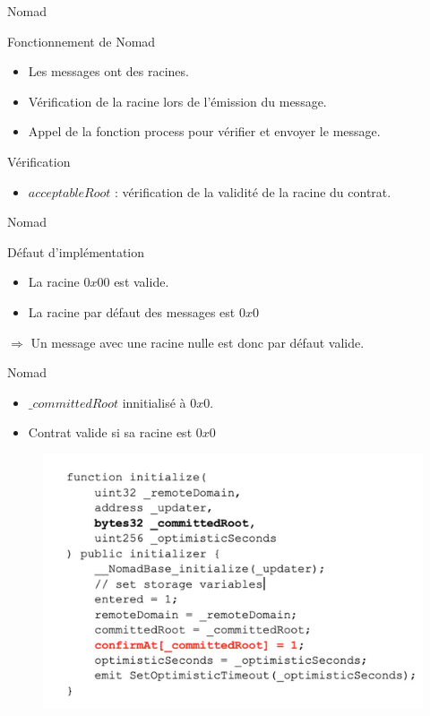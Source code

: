 \begin{frame}{Nomad}
    \begin{block}{Fonctionnement de Nomad}
        \begin{itemize}
            \item Les messages ont des racines.
            \item Vérification de la racine lors de l'émission du message.
            \item Appel de la fonction process pour vérifier et envoyer le message.
        \end{itemize}
    \end{block}
    \pause
    \begin{block}{Vérification}
        \begin{itemize}
            \item $acceptableRoot$ : vérification de la validité de la racine du contrat.
        \end{itemize}
    \end{block}
\end{frame}

\begin{frame}{Nomad}
    \begin{block}{Défaut d'implémentation}
        \begin{itemize}
            \item La racine $0x00$ est valide.
            \item La racine par défaut des messages est $0x0$
        \end{itemize}
        $\Rightarrow$ Un message avec une racine nulle est donc par défaut valide.
    \end{block}
\end{frame}

\begin{frame}{Nomad}
    \begin{itemize}
        \item $\_committedRoot$ innitialisé à $0x0$.
        \item Contrat valide si sa racine est $0x0$
    \end{itemize}
    \begin{figure}
        \centering
        \includegraphics[scale = 0.3]{img/nomad_img1.png}
    \end{figure}
\end{frame}

